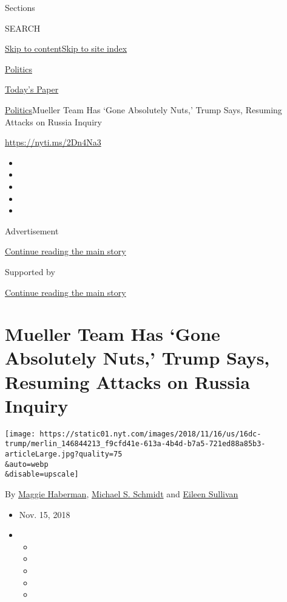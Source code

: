 Sections

SEARCH

\protect\hyperlink{site-content}{Skip to
content}\protect\hyperlink{site-index}{Skip to site index}

\href{https://www.nytimes.com/section/politics}{Politics}

\href{https://myaccount.nytimes.com/auth/login?response_type=cookie\&client_id=vi}{}

\href{https://www.nytimes.com/section/todayspaper}{Today's Paper}

\href{/section/politics}{Politics}\textbar{}Mueller Team Has `Gone
Absolutely Nuts,' Trump Says, Resuming Attacks on Russia Inquiry

\url{https://nyti.ms/2Dn4Na3}

\begin{itemize}
\item
\item
\item
\item
\item
\end{itemize}

Advertisement

\protect\hyperlink{after-top}{Continue reading the main story}

Supported by

\protect\hyperlink{after-sponsor}{Continue reading the main story}

\hypertarget{mueller-team-has-gone-absolutely-nuts-trump-says-resuming-attacks-on-russia-inquiry}{%
\section{Mueller Team Has `Gone Absolutely Nuts,' Trump Says, Resuming
Attacks on Russia
Inquiry}\label{mueller-team-has-gone-absolutely-nuts-trump-says-resuming-attacks-on-russia-inquiry}}

\texttt{[image: https://static01.nyt.com/images/2018/11/16/us/16dc-trump/merlin\_146844213\_f9cfd41e-613a-4b4d-b7a5-721ed88a85b3-articleLarge.jpg?quality=75\\\&auto=webp\\\&disable=upscale]}

By \href{https://www.nytimes.com/by/maggie-haberman}{Maggie Haberman},
\href{https://www.nytimes.com/by/michael-s-schmidt}{Michael S. Schmidt}
and \href{https://www.nytimes.com/by/eileen-sullivan}{Eileen Sullivan}

\begin{itemize}
\item
  Nov. 15, 2018
\item
  \begin{itemize}
  \item
  \item
  \item
  \item
  \item
  \end{itemize}
\end{itemize}

